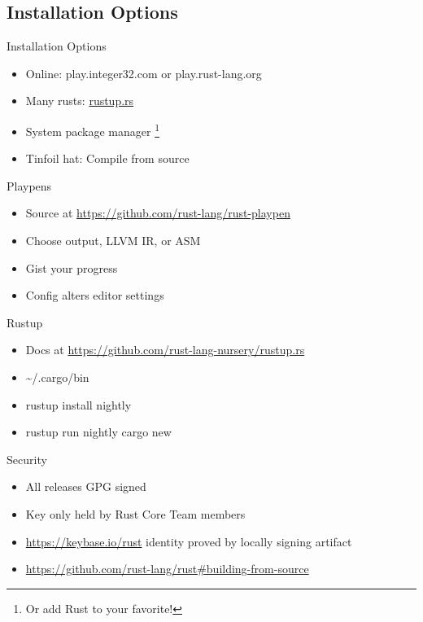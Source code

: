 \documentclass[50pt]{beamer}
\begin{document}
\subsection{Installation Options}

\begin{frame}
    Installation Options
    \begin{itemize}
        \item Online: play.integer32.com or play.rust-lang.org
        \item Many rusts: \url{rustup.rs}
        \item System package manager \footnote{Or add Rust to your favorite!}
        \item Tinfoil hat: Compile from source
    \end{itemize}
\end{frame}

\begin{frame}
    Playpens
    \begin{itemize}
        \item Source at \url{https://github.com/rust-lang/rust-playpen}
        \item Choose output, LLVM IR, or ASM
        \item Gist your progress
        \item Config alters editor settings
    \end{itemize}
\end{frame}

\begin{frame}
    Rustup
    \begin{itemize}
        \item Docs at \url{https://github.com/rust-lang-nursery/rustup.rs}
        \item \textasciitilde /.cargo/bin
        \item rustup install nightly
        \item rustup run nightly cargo new
    \end{itemize}
\end{frame}

\begin{frame}
    Security
    \begin{itemize}
        \item All releases GPG signed
        \item Key only held by Rust Core Team members
        \item \url{https://keybase.io/rust} identity proved by locally signing artifact
        \item \url{https://github.com/rust-lang/rust\#building-from-source}
    \end{itemize}
\end{frame}
\end{document}
